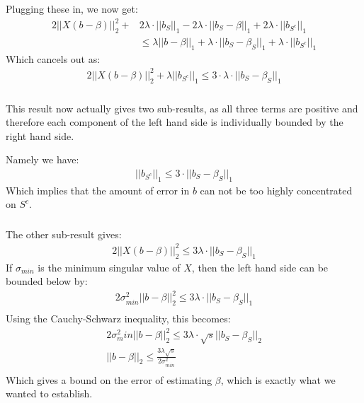 \begin{frame}[fragile] \frametitle{}

Plugging these in, we now get:
\begin{align*}
2 || X (b - \beta) ||_2^2 + &2 \lambda \cdot || b_S ||_1 - 2 \lambda \cdot || b_S - \beta ||_1
  + 2 \lambda \cdot || b_{S^c} ||_1 \\
&\leq \lambda || b - \beta ||_1 + \lambda \cdot || b_S - \beta_S ||_1 + \lambda \cdot || b_{S^c} ||_1
\end{align*}
\pause Which cancels out as:
\begin{align*}
2 || X (b - \beta) ||_2^2 + \lambda || b_{S^c} ||_1 \leq 3 \cdot \lambda \cdot || b_S - \beta_S ||_1
\end{align*}

\end{frame}

\begin{frame}[fragile] \frametitle{}

This result now actually gives two sub-results, as all three terms are positive and
therefore each component of the left hand side is individually bounded by the right
hand side.

\pause Namely we have:
\begin{align*}
|| b_{S^c} ||_1 \leq 3 \cdot || b_S - \beta_S ||_1
\end{align*}
Which implies that the amount of error in $b$ can not be too highly concentrated
on $S^c$.

\end{frame}

\begin{frame}[fragile] \frametitle{}

The other sub-result gives:
\begin{align*}
2 || X (b - \beta) ||_2^2 \leq 3 \lambda \cdot || b_S - \beta_S ||_1
\end{align*}
\pause If $\sigma_{min}$ is the minimum singular value of $X$, then the
left hand side can be bounded below by:
\begin{align*}
2 \sigma^2_{min} || b - \beta ||_2^2 \leq 3 \lambda \cdot || b_S - \beta_S ||_1\\
\end{align*}
\pause Using the Cauchy-Schwarz inequality, this becomes:
\begin{align*}
2 \sigma^2_min || b - \beta ||_2^2 \leq 3 \lambda \cdot \sqrt{s} || b_S - \beta_S ||_2\\
|| b - \beta ||_2 \leq \frac{3 \lambda \sqrt{s}}{2\sigma^2_{min}} \\
\end{align*}
Which gives a bound on the error of estimating $\beta$, which is exactly what we wanted
to establish.

\end{frame}

